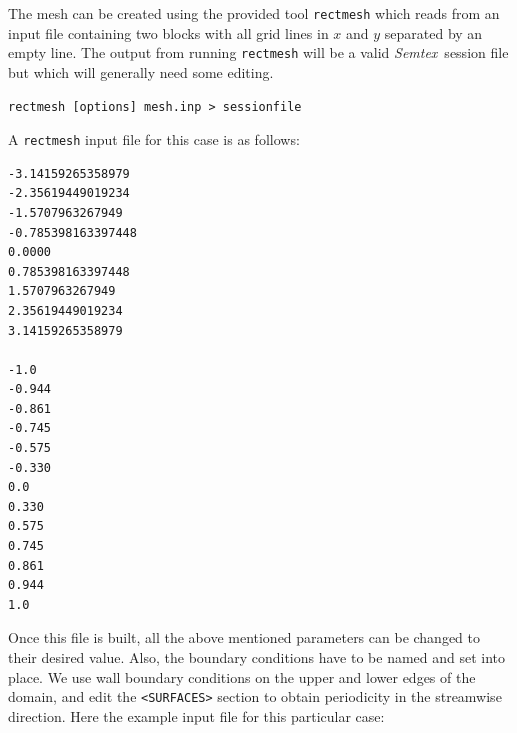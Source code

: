 \documentclass[11pt]{report}
\newcommand{\Semtex}{\emph{Semtex}} \newcommand{\Dog}{\emph{Dog}}
\begin{document}

The mesh can be created using the provided tool \texttt{rectmesh}
which reads from an input file containing two blocks with all grid
lines in $x$ and $y$ separated by an empty line. The output from
running \verb|rectmesh| will be a valid \Semtex\ session file but which
will generally need some editing. 

{\small
\begin{verbatim}
rectmesh [options] mesh.inp > sessionfile
\end{verbatim}
}

A \verb|rectmesh| input file for this case is as follows: {\small
\begin{verbatim}
-3.14159265358979
-2.35619449019234
-1.5707963267949
-0.785398163397448
0.0000
0.785398163397448
1.5707963267949
2.35619449019234
3.14159265358979

-1.0
-0.944
-0.861
-0.745
-0.575
-0.330
0.0
0.330
0.575
0.745
0.861
0.944
1.0
\end{verbatim}
}

Once this file is built, all the above mentioned parameters can be
changed to their desired value. Also, the boundary conditions have to
be named and set into place.  We use wall boundary conditions on the
upper and lower edges of the domain, and edit the \verb|<SURFACES>|
section to obtain periodicity in the streamwise direction. Here the
example input file for this particular case:
\end{document}
